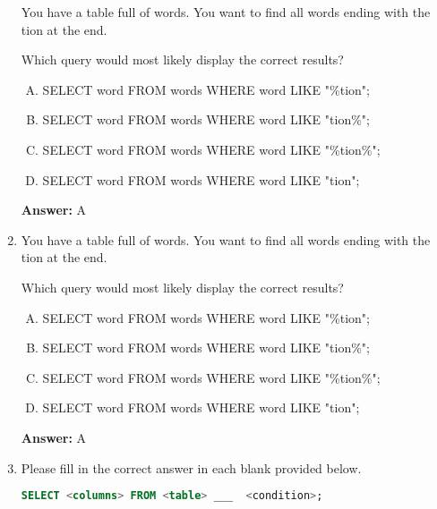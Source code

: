 \documentclass[12pt]{article}
\begin{document}
\begin{enumerate}[1.]
    You have a table full of words. You want to find all words ending with the tion
    at the end.

    \bigskip

    Which query would most likely display the correct results?

    \bigskip

    \begin{enumerate}[A.]
        \item SELECT word FROM words WHERE word LIKE "\%tion";
        \item SELECT word FROM words WHERE word LIKE "tion\%";
        \item SELECT word FROM words WHERE word LIKE "\%tion\%";
        \item SELECT word FROM words WHERE word LIKE "tion";
    \end{enumerate}

    \bigskip

    \textbf{Answer:} A

    \item

    You have a table full of words. You want to find all words ending with the tion
    at the end.

    \bigskip

    Which query would most likely display the correct results?

    \bigskip

    \begin{enumerate}[A.]
        \item SELECT word FROM words WHERE word LIKE "\%tion";
        \item SELECT word FROM words WHERE word LIKE "tion\%";
        \item SELECT word FROM words WHERE word LIKE "\%tion\%";
        \item SELECT word FROM words WHERE word LIKE "tion";
    \end{enumerate}

    \bigskip

    \textbf{Answer:} A

    \item

    Please fill in the correct answer in each blank provided below.

    \bigskip

    \begin{lstlisting}[language=SQL]
    SELECT <columns> FROM <table> ___  <condition>;
    \end{lstlisting}


\end{enumerate}
\end{document}
